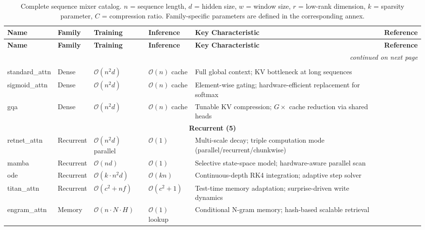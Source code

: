 \footnotesize
\begin{longtable}{p{2.0cm}p{1.3cm}p{2.2cm}p{2.2cm}p{4.0cm}p{2.5cm}}
\toprule
\textbf{Name} & \textbf{Family} & \textbf{Training} & \textbf{Inference} & \textbf{Key Characteristic} & \textbf{Reference} \\
\midrule
\endfirsthead
\toprule
\textbf{Name} & \textbf{Family} & \textbf{Training} & \textbf{Inference} & \textbf{Key Characteristic} & \textbf{Reference} \\
\midrule
\endhead
\midrule
\multicolumn{6}{r}{\textit{continued on next page}} \\
\endfoot
\bottomrule
\caption{Complete sequence mixer catalog. $n$ = sequence length, $d$ = hidden size, $w$ = window size, $r$ = low-rank dimension, $k$ = sparsity parameter, $C$ = compression ratio. Family-specific parameters are defined in the corresponding annex.}
\label{tab:all-mixers}
\endlastfoot

\multicolumn{6}{c}{\textbf{Dense (3)}} \\
\midrule
standard\_attn & Dense & $\mathcal{O}(n^2 d)$ & $\mathcal{O}(n)$ cache & Full global context; KV bottleneck at long sequences & \citep{vaswani_attention_2017} \\
sigmoid\_attn & Dense & $\mathcal{O}(n^2 d)$ & $\mathcal{O}(n)$ cache & Element-wise gating; hardware-efficient replacement for softmax & \citep{ramapuram_theory_2024} \\
gqa & Dense & $\mathcal{O}(n^2 d)$ & $\mathcal{O}(n)$ cache & Tunable KV compression; $G\times$ cache reduction via shared heads & \citep{ainslie_gqa_2023} \\
\midrule

\multicolumn{6}{c}{\textbf{Recurrent (5)}} \\
\midrule
retnet\_attn & Recurrent & $\mathcal{O}(n^2 d)$ parallel & $\mathcal{O}(1)$ & Multi-scale decay; triple computation mode (parallel/recurrent/chunkwise) & \citep{sun_retentive_2023} \\
mamba & Recurrent & $\mathcal{O}(n d)$ & $\mathcal{O}(1)$ & Selective state-space model; hardware-aware parallel scan & \citep{gu_mamba_2023} \\
ode & Recurrent & $\mathcal{O}(k \cdot n^2 d)$ & $\mathcal{O}(k n)$ & Continuous-depth RK4 integration; adaptive step solver & \citep{zhang_continuous_2021} \\
titan\_attn & Recurrent & $\mathcal{O}(c^2 + n f)$ & $\mathcal{O}(c^2 + 1)$ & Test-time memory adaptation; surprise-driven write dynamics & \citep{behrouz_titans_2025} \\
engram\_attn & Memory & $\mathcal{O}(n \cdot N \cdot H)$ & $\mathcal{O}(1)$ lookup & Conditional N-gram memory; hash-based scalable retrieval & \citep{cheng2026conditionalmemoryscalablelookup} \\
\midrule


\end{longtable}
